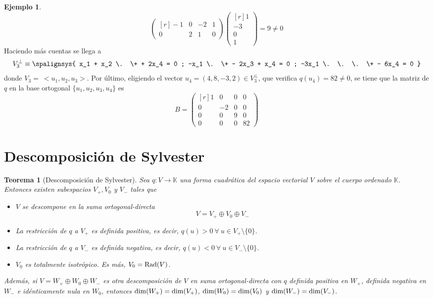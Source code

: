 \documentclass[12pt]{report}
\newtheorem{theorem}{Teorema}[chapter]
\theoremstyle{definition}
\theoremstyle{definition}
\newtheorem{example}{Ejemplo}[chapter]
\theoremstyle{remark}
\begin{document}
\begin{example}
\[\begin{pmatrix*}[r]
    -1 & 0 & -2 & 1 \\
    0 & 2 & 1 & 0
\end{pmatrix*} \begin{pmatrix*}[r]
    1 \\
    -3 \\
    0 \\
    1
\end{pmatrix*} = 9 \neq 0\]
Haciendo más cuentas se llega a
\[V_3^\perp \equiv 
\spalignsys{
x_1 + x_2 \. \+ + 2x_4 = 0 ;
-x_1 \. \+ - 2x_3 + x_4 = 0 ;
-3x_1 \. \. \. \+ - 6x_4 = 0
}\]
donde $V_3 = \ <u_1,u_2,u_3>$. Por último, eligiendo el vector $u_4=(4,8,-3,2) \in V_3^\perp$, que verifica $q(u_4)=82 \neq 0$, se tiene que la matriz de $q$ en la base ortogonal $\{u_1,u_2,u_3,u_4\}$ es
\[B = \begin{pmatrix*}[r]
    1 & 0 & 0 & 0 \\
    0 & -2 & 0 & 0 \\
    0 & 0 & 9 & 0 \\
    0 & 0 & 0 & 82
\end{pmatrix*}\]
\end{example}

\section{Descomposición de Sylvester}

\begin{theorem}[Descomposición de Sylvester]
Sea $q \colon V \to \mathbb{K}$ una forma cuadrática del espacio vectorial $V$ sobre el cuerpo ordenado $\mathbb{K}$. Entonces existen subespacios $V_+, V_0$ y $V_-$ tales que
\begin{itemize}
    \item[(i)] $V$ se descompone en la suma ortogonal-directa 
    \[V = V_+ \oplus V_0 \oplus V_-\]
    \item[(ii)] La restricción de $q$ a $V_+$ es definida positiva, es decir, $q(u) > 0 \ \forall \ u \in V_+ \setminus \{0\}$.
    \item[(iii)] La restricción de $q$ a $V_-$ es definida negativa, es decir, $q(u) < 0 \ \forall \ u \in V_- \setminus \{0\}$.
    \item[(iv)] $V_0$ es totalmente isotrópico. Es más, $V_0 = \textup{Rad}(V)$.
\end{itemize}

Además, si $V = W_+ \oplus W_0 \oplus W_-$ es otra descomposición de $V$ en suma ortogonal-directa con $q$ definida positiva en $W_+$, definida negativa en $W_-$ e idénticamente nula en $W_0$, entonces $\textup{dim}(W_+) = \textup{dim}(V_+)$, $\textup{dim}(W_0) = \textup{dim}(V_0)$ y $\textup{dim}(W_-) = \textup{dim}(V_-)$.
\end{theorem}
\end{document}
